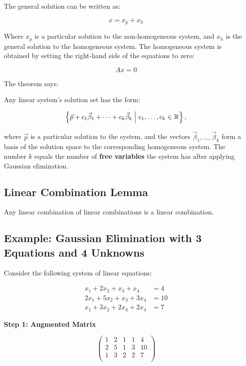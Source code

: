 The general solution can be written as:

\[
	x = x_p + x_h
\]

Where \( x_p \) is a particular solution to the non-homogeneous system, and \( x_h \) is the general 
solution to the homogeneous system. The homogeneous system is obtained by setting the right-hand side 
of the equations to zero:

\[
	A x = 0
\]

The theorem says:

Any linear system's solution set has the form:

\[
	\left\{ \vec{p} + c_1\vec{\beta}_1 + \cdots + c_k\vec{\beta}_k \;\middle|\; c_1, \ldots, c_k \in 
	\mathbb{R} \right\},
\]

where \(\vec{p}\) is a particular solution to the system, and the vectors \(\vec{\beta}_1, 
\ldots, \vec{\beta}_k\) form a basis of the solution space to the corresponding homogeneous system. 
The number \(k\) equals the number of \textbf{free variables} the system has after applying Gaussian 
elimination.

\subsection{Linear Combination Lemma}

Any linear combination of linear combinations is a linear combination.

\subsection{Example: Gaussian Elimination with 3 Equations and 4 Unknowns}

Consider the following system of linear equations:

\begin{align*}
	x_1 + 2x_2 + x_3 + x_4   & = 4  \\
	2x_1 + 5x_2 + x_3 + 3x_4 & = 10 \\
	x_1 + 3x_2 + 2x_3 + 2x_4 & = 7
\end{align*}

\textbf{Step 1: Augmented Matrix}

\[
	\begin{pmatrix}
		1 & 2 & 1 & 1 & 4  \\
		2 & 5 & 1 & 3 & 10 \\
		1 & 3 & 2 & 2 & 7  \\
	\end{pmatrix}
\]

